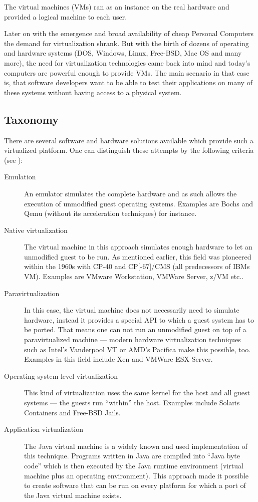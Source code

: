 The  virtual machines
(VMs)  ran as  an instance  on the  real hardware  and provided  a logical
machine to  each user. 

Later  on with  the emergence  and  broad availability  of cheap  Personal
Computers  the demand  for virtualization  shrank. But  with the  birth of
dozens of  operating and hardware systems (DOS,  Windows, Linux, Free-BSD,
Mac OS and many more),  the need for virtualization technologies came back
into mind  and today's computers are  powerful enough to  provide VMs. The
main scenario in that case is, that software developers want to be able to
test their applications on many  of these systems without having access to
a physical system.

\subsection{Taxonomy}

There are several software  and hardware solutions available which provide
such a  virtualized platform.  One can distinguish  these attempts  by the
following criteria (see \cite{virtualization-survey}):

\begin{description}
\item[Emulation] An  emulator simulates the complete hardware  and as such
  allows the execution of unmodified guest operating systems. Examples are
  Bochs and Qemu (without its acceleration techniques) for instance.
\item[Native vir\-tu\-ali\-za\-tion] The  virtual machine in this approach
  simulates  enough hardware  to let  an unmodified  guest to  be  run. As
  mentioned earlier, this field was  pioneered within the 1960s with CP-40
  and  CP[-67]/CMS (all  predecessors of  IBMs VM).   Examples  are VMware
  Workstation, VMWare Server, z/VM etc..
\item[Paravirtualization]  In  this case,  the  virtual  machine does  not
  necessarily need to simulate hardware, instead it provides a special API
  to which a guest system has to  be ported. That means one can not run an
  unmodified guest on top of a paravirtualized machine --- modern hardware
  virtualization  techniques  such  as  Intel's  Vanderpool  VT  or  AMD's
  Pacifica make this possible, too. Examples in this field include Xen and
  VMWare ESX Server.
\item[Operating system-level  virtualization] This kind  of virtualization
  uses the same  kernel for the host and all guest  systems --- the guests
  run  ``within''  the  host.   Examples include  Solaris  Containers  and
  Free-BSD Jails.
\item[Application  virtualization] The  Java virtual  machine is  a widely
  known  and used implementation  of this  technique. Programs  written in
  Java are compiled into ``Java byte  code'' which is then executed by the
  Java   runtime   environment   (virtual   machine  plus   an   operating
  environment).  This  approach made it  possible to create  software that
  can  be run  on every  platform for  which a  port of  the  Java virtual
  machine exists.
\end{description}


